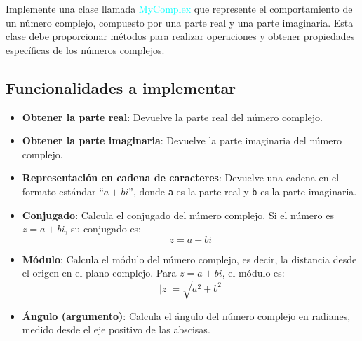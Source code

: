 Implemente una clase llamada \textcolor{cyan}{MyComplex} que represente el comportamiento de un número complejo, compuesto por una parte real y una parte imaginaria. Esta clase debe proporcionar métodos para realizar operaciones y obtener propiedades específicas de los números complejos.

\subsection*{Funcionalidades a implementar}
\begin{itemize}
    \item \textbf{Obtener la parte real}: Devuelve la parte real del número complejo.
    \item \textbf{Obtener la parte imaginaria}: Devuelve la parte imaginaria del número complejo.
    \item \textbf{Representación en cadena de caracteres}: Devuelve una cadena en el formato estándar “$a + bi$”, donde \texttt{a} es la parte real y \texttt{b} es la parte imaginaria.
    \item \textbf{Conjugado}: Calcula el conjugado del número complejo. Si el número es $z = a + bi$, su conjugado es:
    \[
    \overline{z} = a - bi
    \]
    \item \textbf{Módulo}: Calcula el módulo del número complejo, es decir, la distancia desde el origen en el plano complejo. Para $z = a + bi$, el módulo es:
    \[
    |z| = \sqrt{a^2 + b^2}
    \]
    \item \textbf{Ángulo (argumento)}: Calcula el ángulo del número complejo en radianes, medido desde el eje positivo de las abscisas. 

\end{itemize}
